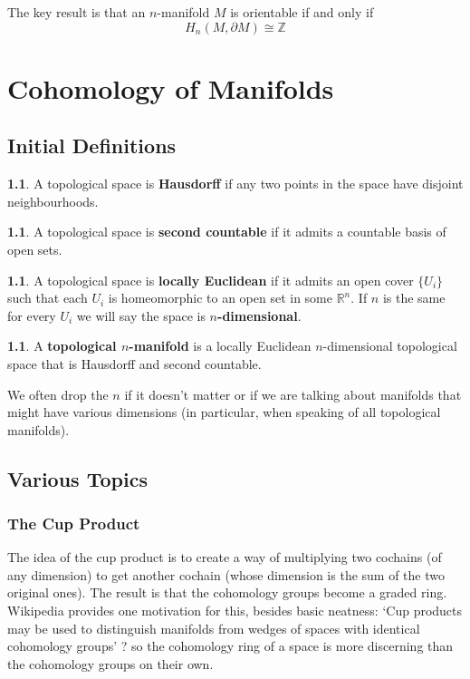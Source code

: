 \documentclass[oneside,english]{amsbook}
\numberwithin{section}{chapter}
\theoremstyle{plain}
\theoremstyle{definition}
\newtheorem{defn}[thm]{\protect\definitionname}
\providecommand{\definitionname}{Definition}
\begin{document}
	The key result is that an $n$-manifold $M$ is orientable if and only if
	\[
		H_n(M, \partial M) \cong \mathbb{Z}  
	\]
	
	\part{Cohomology of Manifolds}
	
	\chapter{Initial Definitions}
	
		\begin{defn} 
			A topological space is \textbf{Hausdorff} if any two points in the space have disjoint neighbourhoods.
		\end{defn}
		
		\begin{defn} 
			A topological space is \textbf{second countable} if it admits a countable basis of open sets.
		\end{defn}

		\begin{defn} 
			A topological space is \textbf{locally Euclidean} if it admits an open cover $\{U_i\}$ such that each $U_i$ is homeomorphic to an open set in some $\mathbb{R}^n$. If $n$ is the same for every $U_i$ we will say the space is \textbf{$n$-dimensional}.
		\end{defn}

		\begin{defn} 
			A \textbf{topological $n$-manifold} is a locally Euclidean $n$-dimensional topological space that is Hausdorff and second countable.  
		\end{defn}
		
		We often drop the $n$ if it doesn't matter or if we are talking about manifolds that might have various dimensions (in particular, when speaking of all topological manifolds).
	
	
	\chapter{Various Topics}
	
	\section{The Cup Product}
	
	The idea of the cup product is to create a way of multiplying two cochains (of any dimension) to get another cochain (whose dimension is the sum of the two original ones). The result is that the cohomology groups become a graded ring. Wikipedia provides one motivation for this, besides basic neatness: `Cup products may be used to distinguish manifolds from wedges of spaces with identical cohomology groups' ? so the cohomology ring of a space is more discerning than the cohomology groups on their own. 
	
\end{document}
